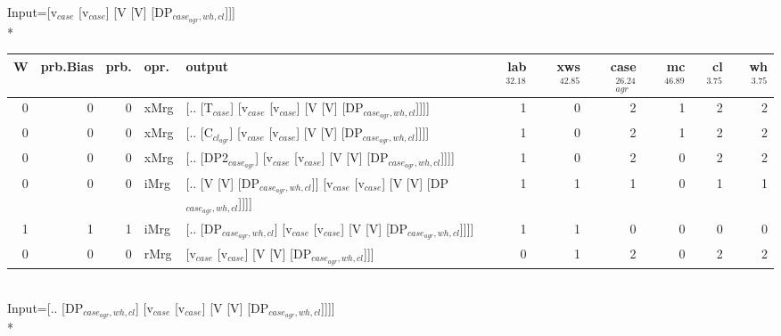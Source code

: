 \begingroup\scriptsize Input=[v$_{case}$ [v$_{case}$] [V [V] [DP$_{case_{agr},wh,cl}$]]]\\*
\begin{tabularx}{\linewidth}{rrrlXrrrrrr}
\hline
   W &   prb.Bias &   prb. & opr.   & output                                                                         &   lab$^{32.18}$ &   xws$^{42.85}$ &   case$_{agr}^{26.24}$ &   mc$^{46.89}$ &   cl$^{3.75}$ &   wh$^{3.75}$ \\
\hline
   0 &       0 &   0 & xMrg & [.. [T$_{case}$] [v$_{case}$ [v$_{case}$] [V [V] [DP$_{case_{agr},wh,cl}$]]]]                    &             1 &             0 &                  2 &            1 &        2 &        2 \\
   0 &       0 &   0 & xMrg & [.. [C$_{cl_{agr}}$] [v$_{case}$ [v$_{case}$] [V [V] [DP$_{case_{agr},wh,cl}$]]]]                  &             1 &             0 &                  2 &            1 &        2 &        2 \\
   0 &       0 &   0 & xMrg & [.. [DP2$_{case_{agr}}$] [v$_{case}$ [v$_{case}$] [V [V] [DP$_{case_{agr},wh,cl}$]]]]              &             1 &             0 &                  2 &            0 &        2 &        2 \\
   0 &       0 &   0 & iMrg & [.. [V [V] [DP$_{case_{agr},wh,cl}$]] [v$_{case}$ [v$_{case}$] [V [V] [DP$_{case_{agr},wh,cl}$]]]] &             1 &             1 &                  1 &            0 &        1 &        1 \\
   1 &       1 &   1 & iMrg & [.. [DP$_{case_{agr},wh,cl}$] [v$_{case}$ [v$_{case}$] [V [V] [DP$_{case_{agr},wh,cl}$]]]]         &             1 &             1 &                  0 &            0 &        0 &        0 \\
   0 &       0 &   0 & rMrg & [v$_{case}$ [v$_{case}$] [V [V] [DP$_{case_{agr},wh,cl}$]]]                                  &             0 &             1 &                  2 &            0 &        2 &        2 \\
\hline
\end{tabularx}\endgroup\\
\begingroup\scriptsize Input=[.. [DP$_{case_{agr},wh,cl}$] [v$_{case}$ [v$_{case}$] [V [V] [DP$_{case_{agr},wh,cl}$]]]]\\*
